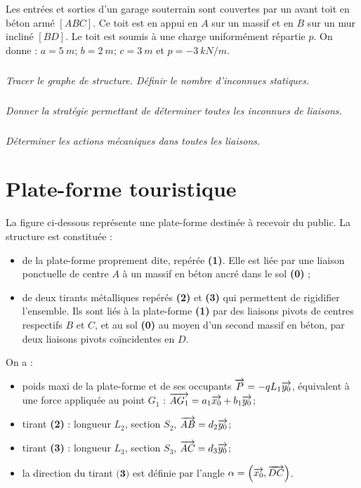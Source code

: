 \documentclass[10pt,fleqn]{article} %
\begin{document}
\begin{multicols}{2}
Les entrées et sorties d’un garage souterrain sont couvertes par un avant toit en béton armé $[ABC]$. Ce toit est en appui en $A$ sur un massif et en $B$ sur un mur incliné $[BD]$. Le toit est soumis à une charge uniformément répartie $p$. On donne :
$a=\SI{5}{m}$; $b=\SI{2}{m}$; $c=\SI{3}{m}$ et $p=\SI{-3}{kN/m}$.


\subparagraph{}\textit{Tracer le graphe de structure. Définir le nombre d'inconnues statiques.}

\subparagraph{}\textit{Donner la stratégie permettant de déterminer toutes les inconnues de liaisons.}

\subparagraph{}\textit{Déterminer les actions mécaniques dans toutes les liaisons.}


\section*{Plate-forme touristique}
\setcounter{exo}{0}

La figure ci-dessous représente une plate-forme destinée à recevoir du public. La structure est constituée :
\begin{itemize}
\item de la plate-forme proprement dite, repérée \textbf{(1)}. Elle est liée par une liaison ponctuelle de centre $A$ à un massif en béton ancré dans le sol \textbf{(0)} ;
\item de deux tirants métalliques repérés \textbf{(2)} et \textbf{(3)} qui permettent de rigidifier l’ensemble. Ils sont liés à la plate-forme \textbf{(1)} par des liaisons pivots de centres respectifs $B$ et $C$, et au sol \textbf{(0)} au moyen d’un second massif en béton, par deux liaisons pivots coïncidentes en $D$.
\end{itemize}

On a :
\begin{itemize}
\item poids maxi de la plate-forme et de ses occupants $\overrightarrow{P}=-qL_1 \overrightarrow{y_0}$, équivalent à une force appliquée au point $G_1$ : $\overrightarrow{AG_1}=a_1\overrightarrow{x_0} + b_1\overrightarrow{y_0}$;
\item tirant \textbf{(2)} : longueur $L_2$, section $S_2$, $\overrightarrow{AB}=d_2 \overrightarrow{y_0}$;
\item tirant \textbf{(3)} : longueur $L_3$, section $S_3$, $\overrightarrow{AC}=d_3 \overrightarrow{y_0}$;
\item la direction du tirant $\textbf{(3)}$ est définie par l'angle $\alpha=\left(\overrightarrow{x_0},\overrightarrow{DC}\right)$.
\end{itemize}


\end{multicols}
\end{document}
